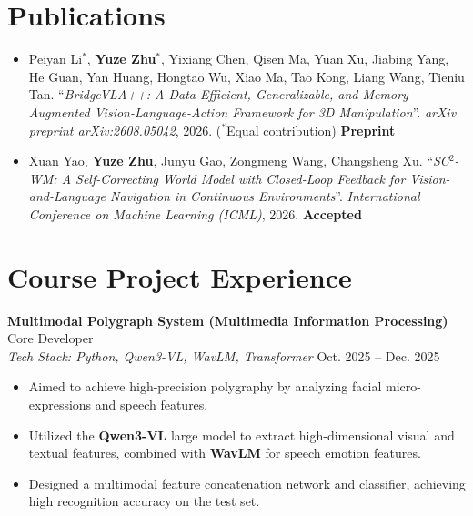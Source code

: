 \documentclass[11pt,a4paper]{article}
\begin{document}
\section{Publications}
\begin{itemize}
    \item Peiyan Li$^*$, \textbf{Yuze Zhu}$^*$, Yixiang Chen, Qisen Ma, Yuan Xu, Jiabing Yang, He Guan, Yan Huang, Hongtao Wu, Xiao Ma, Tao Kong, Liang Wang, Tieniu Tan. ``\textit{BridgeVLA++: A Data-Efficient, Generalizable, and Memory-Augmented Vision-Language-Action Framework for 3D Manipulation}''. \textit{arXiv preprint arXiv:2608.05042}, 2026. ($^*$Equal contribution) \hfill \textbf{Preprint}
    \item Xuan Yao, \textbf{Yuze Zhu}, Junyu Gao, Zongmeng Wang, Changsheng Xu. ``\textit{SC$^2$-WM: A Self-Correcting World Model with Closed-Loop Feedback for Vision-and-Language Navigation in Continuous Environments}''. \textit{International Conference on Machine Learning (ICML)}, 2026. \hfill \textbf{Accepted}
\end{itemize}

\section{Course Project Experience}
\textbf{Multimodal Polygraph System (Multimedia Information Processing)} \hfill Core Developer \\
\textit{Tech Stack: Python, Qwen3-VL, WavLM, Transformer} \hfill Oct. 2025 -- Dec. 2025
\begin{itemize}
    \item Aimed to achieve high-precision polygraphy by analyzing facial micro-expressions and speech features.
    \item Utilized the \textbf{Qwen3-VL} large model to extract high-dimensional visual and textual features, combined with \textbf{WavLM} for speech emotion features.
    \item Designed a multimodal feature concatenation network and classifier, achieving high recognition accuracy on the test set.
\end{itemize}
\end{document}
